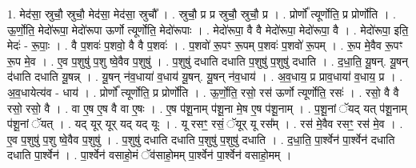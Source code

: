 \documentclass[17pt]{extarticle}
\begin{document}
1. मेद॑सा॒ स्रुचौ॒ स्रुचौ॒ मेद॑सा॒ मेद॑सा॒ स्रुचौ᳚ । . स्रुचौ॒ प्र प्र स्रुचौ॒ स्रुचौ॒ प्र । . प्रोर्णो᳚ त्यूर्णोति॒ प्र प्रोर्णो॑ति । . ऊ॒र्णो॒ति॒ मेदो॑रूपा॒ मेदो॑रूपा ऊर्णो त्यूर्णोति॒ मेदो॑रूपाः । . मेदो॑रूपा॒ वै वै मेदो॑रूपा॒ मेदो॑रूपा॒ वै । . मेदो॑रूपा॒ इति॒ मेदः॑ - रू॒पाः॒ । . वै प॒शवः॑ प॒शवो॒ वै वै प॒शवः॑ । . प॒शवो॑ रू॒पꣳ रू॒पम् प॒शवः॑ प॒शवो॑ रू॒पम् । . रू॒प मे॒वैव रू॒पꣳ रू॒प मे॒व । . ए॒व प॒शुषु॑ प॒शु ष्वे॒वैव प॒शुषु॑ । . प॒शुषु॑ दधाति दधाति प॒शुषु॑ प॒शुषु॑ दधाति । . द॒धा॒ति॒ यू॒षन्. यू॒षन् द॑धाति दधाति यू॒षन्न् । . यू॒षन् न॑व॒धाया॑ व॒धाय॑ यू॒षन्. यू॒षन् न॑व॒धाय॑ । . अ॒व॒धाय॒ प्र प्राव॒धाया॑ व॒धाय॒ प्र । . अ॒व॒धायेत्य॑व - धाय॑ । . प्रोर्णो᳚ त्यूर्णोति॒ प्र प्रोर्णो॑ति । . ऊ॒र्णो॒ति॒ रसो॒ रस॑ ऊर्णो त्यूर्णोति॒ रसः॑ । . रसो॒ वै वै रसो॒ रसो॒ वै । . वा ए॒ष ए॒ष वै वा ए॒षः । . ए॒ष प॑शू॒नाम् प॑शू॒ना मे॒ष ए॒ष प॑शू॒नाम् । . प॒शू॒नां ॅयद् यत् प॑शू॒नाम् प॑शू॒नां ॅयत् । . यद् यूर् यूर् यद् यद् यूः । . यू रसꣳ॒॒ रसं॒ ॅयूर् यू रस᳚म् । . रस॑ मे॒वैव रसꣳ॒॒ रस॑ मे॒व । . ए॒व प॒शुषु॑ प॒शु ष्वे॒वैव प॒शुषु॑ । . प॒शुषु॑ दधाति दधाति प॒शुषु॑ प॒शुषु॑ दधाति । . द॒धा॒ति॒ पा॒र्श्वेन॑ पा॒र्श्वेन॑ दधाति दधाति पा॒र्श्वेन॑ । . पा॒र्श्वेन॑ वसाहो॒मं ॅव॑साहो॒मम् पा॒र्श्वेन॑ पा॒र्श्वेन॑ वसाहो॒मम् । \newline
\end{document}
